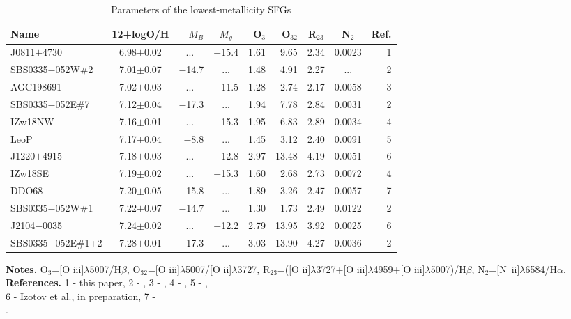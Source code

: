 \begin{table*}
\caption{Parameters of the lowest-metallicity SFGs \label{tab4}}
\begin{tabular}{lcrcrrccr} \hline
Name                             &12+logO/H&$M_B$&$M_g$&O$_3$&O$_{32}$&R$_{23}$&N$_{2}$&Ref.          \\ \hline
J0811$+$4730        &6.98$\pm$0.02& ...~~ &$-$15.4&1.61& 9.65&2.34&0.0023&1\\
SBS0335$-$052W\#2   &7.01$\pm$0.07&$-$14.7& ...   &1.48& 4.91&2.27& ...  &2\\
AGC198691           &7.02$\pm$0.03& ...~~ &$-$11.5&1.28& 2.74&2.17&0.0058&3\\
SBS0335$-$052E\#7   &7.12$\pm$0.04&$-$17.3& ...   &1.94& 7.78&2.84&0.0031&2\\
IZw18NW             &7.16$\pm$0.01& ...~~ &$-$15.3&1.95& 6.83&2.89&0.0034&4\\
LeoP                &7.17$\pm$0.04&$-$8.8 & ...   &1.45& 3.12&2.40&0.0091&5\\
J1220$+$4915        &7.18$\pm$0.03& ...~~ &$-$12.8&2.97&13.48&4.19&0.0051&6\\
IZw18SE             &7.19$\pm$0.02& ...~~ &$-$15.3&1.60& 2.68&2.73&0.0072&4\\
DDO68               &7.20$\pm$0.05&$-$15.8& ...   &1.89& 3.26&2.47&0.0057&7\\
SBS0335$-$052W\#1   &7.22$\pm$0.07&$-$14.7& ...   &1.30& 1.73&2.49&0.0122&2\\
J2104$-$0035        &7.24$\pm$0.02& ...~~ &$-$12.2&2.79&13.95&3.92&0.0025&6\\
SBS0335$-$052E\#1+2 &7.28$\pm$0.01&$-$17.3& ...   &3.03&13.90&4.27&0.0036&2\\
\hline
  \end{tabular}

{\bf Notes.} O$_3$=[O {\sc iii}]$\lambda$5007/H$\beta$, O$_{32}$=[O {\sc iii}]$\lambda$5007/[O {\sc ii}]$\lambda$3727, R$_{23}$=([O {\sc ii}]$\lambda$3727+[O {\sc iii}]$\lambda$4959+[O {\sc iii}]$\lambda$5007)/H$\beta$, N$_2$=[N~{\sc ii}]$\lambda$6584/H$\alpha$.~~~~\\

{\bf References.} 
1 - this paper, 2 - \citet{I09}, 3 - \citet{H16}, 4 - \citet{IT98}, 
5 - \citet{S13}, \\ 
6 - Izotov et al., in preparation, 7 - \citet{B12}.~~~~~~~~~~~~~~~~~~~~~~~~~~~~~~~~~~~~~~~~~~~~~~~~~~~~~~~~~~~~~~~~~~~~~~~~~~~~~~~~~~~~~~~~~~~~~~~~~~~~~~~~~~~~~~~
  \end{table*}
